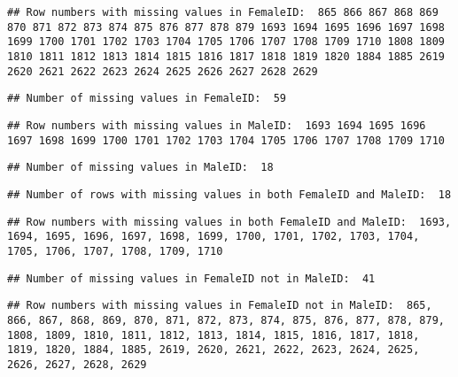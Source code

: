 \documentclass[
]{article}
\begin{document}
\begin{verbatim}
## Row numbers with missing values in FemaleID:  865 866 867 868 869 870 871 872 873 874 875 876 877 878 879 1693 1694 1695 1696 1697 1698 1699 1700 1701 1702 1703 1704 1705 1706 1707 1708 1709 1710 1808 1809 1810 1811 1812 1813 1814 1815 1816 1817 1818 1819 1820 1884 1885 2619 2620 2621 2622 2623 2624 2625 2626 2627 2628 2629
\end{verbatim}

\begin{verbatim}
## Number of missing values in FemaleID:  59
\end{verbatim}

\begin{verbatim}
## Row numbers with missing values in MaleID:  1693 1694 1695 1696 1697 1698 1699 1700 1701 1702 1703 1704 1705 1706 1707 1708 1709 1710
\end{verbatim}

\begin{verbatim}
## Number of missing values in MaleID:  18
\end{verbatim}

\begin{verbatim}
## Number of rows with missing values in both FemaleID and MaleID:  18
\end{verbatim}

\begin{verbatim}
## Row numbers with missing values in both FemaleID and MaleID:  1693, 1694, 1695, 1696, 1697, 1698, 1699, 1700, 1701, 1702, 1703, 1704, 1705, 1706, 1707, 1708, 1709, 1710
\end{verbatim}

\begin{verbatim}
## Number of missing values in FemaleID not in MaleID:  41
\end{verbatim}

\begin{verbatim}
## Row numbers with missing values in FemaleID not in MaleID:  865, 866, 867, 868, 869, 870, 871, 872, 873, 874, 875, 876, 877, 878, 879, 1808, 1809, 1810, 1811, 1812, 1813, 1814, 1815, 1816, 1817, 1818, 1819, 1820, 1884, 1885, 2619, 2620, 2621, 2622, 2623, 2624, 2625, 2626, 2627, 2628, 2629
\end{verbatim}
\end{document}
